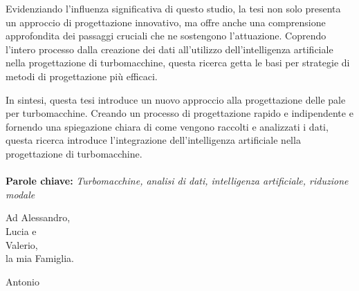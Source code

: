 \documentclass{config/polimiThesis}
\newenvironment{dedication}
{%
\thispagestyle{empty}%
\vspace*{\stretch{1}}%
\itshape             %
\raggedleft          %
}
{\par %
\vspace{\stretch{3}} %
\clearpage           %
}
\begin{document}
Evidenziando l'influenza significativa di questo studio, la tesi non solo presenta un approccio di progettazione innovativo, ma offre anche una comprensione approfondita dei passaggi cruciali che ne sostengono l'attuazione. Coprendo l'intero processo dalla creazione dei dati all'utilizzo dell'intelligenza artificiale nella progettazione di turbomacchine, questa ricerca getta le basi per strategie di metodi di progettazione più efficaci.

In sintesi, questa tesi introduce un nuovo approccio alla progettazione delle pale per turbomacchine. Creando un processo di progettazione rapido e indipendente e fornendo una spiegazione chiara di come vengono raccolti e analizzati i dati, questa ricerca introduce l'integrazione dell'intelligenza artificiale nella progettazione di turbomacchine.
\\
\\
\textbf{Parole chiave:} \textit{Turbomacchine, analisi di dati, intelligenza artificiale, riduzione modale} %


\cleardoublepage
\begin{dedication}

    Ad Alessandro, \\ Lucia e \\ Valerio, \\ la mia Famiglia. 
  
    \vspace{\baselineskip}
    
    Antonio

\end{dedication}

\thispagestyle{empty}
\tableofcontents %
\thispagestyle{empty}
\cleardoublepage

\listoffigures

\listoftables
\end{document}
